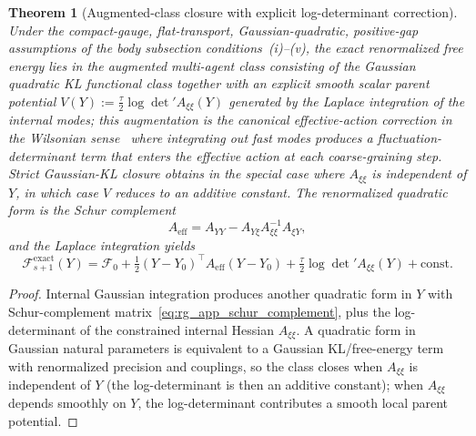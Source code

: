 \documentclass[11pt]{article}
\newtheorem{theorem}{Theorem}
\begin{document}
\begin{theorem}[Augmented-class closure with explicit log-determinant correction]
\label{thm:rg_exact_closure}
Under the compact-gauge, flat-transport, Gaussian-quadratic, positive-gap assumptions of the body subsection conditions~(i)--(v), the exact renormalized free energy lies in the augmented multi-agent class consisting of the Gaussian quadratic KL functional class together with an explicit smooth scalar parent potential $V(Y) := \tfrac{\tau}{2}\log\det{}'A_{\xi\xi}(Y)$ generated by the Laplace integration of the internal modes; this augmentation is the canonical effective-action correction in the Wilsonian sense~\cite{Wilson1974, Cardy1996} where integrating out fast modes produces a fluctuation-determinant term that enters the effective action at each coarse-graining step. Strict Gaussian-KL closure obtains in the special case where $A_{\xi\xi}$ is independent of $Y$, in which case $V$ reduces to an additive constant. The renormalized quadratic form is the Schur complement
\begin{equation}
A_{\mathrm{eff}} = A_{YY} - A_{Y\xi}A_{\xi\xi}^{-1}A_{\xi Y},
\label{eq:rg_app_schur_complement}
\end{equation}
and the Laplace integration yields
\begin{equation}
\mathcal{F}_{s+1}^{\mathrm{exact}}(Y) = \mathcal{F}_0 + \tfrac{1}{2}(Y - Y_0)^\top A_{\mathrm{eff}}(Y - Y_0) + \tfrac{\tau}{2}\log\det{}'A_{\xi\xi}(Y) + \mathrm{const}.
\end{equation}
\end{theorem}

\begin{proof}
Internal Gaussian integration produces another quadratic form in $Y$ with Schur-complement matrix~\eqref{eq:rg_app_schur_complement}, plus the log-determinant of the constrained internal Hessian $A_{\xi\xi}$. A quadratic form in Gaussian natural parameters is equivalent to a Gaussian KL/free-energy term with renormalized precision and couplings, so the class closes when $A_{\xi\xi}$ is independent of $Y$ (the log-determinant is then an additive constant); when $A_{\xi\xi}$ depends smoothly on $Y$, the log-determinant contributes a smooth local parent potential.
\end{proof}
\end{document}
